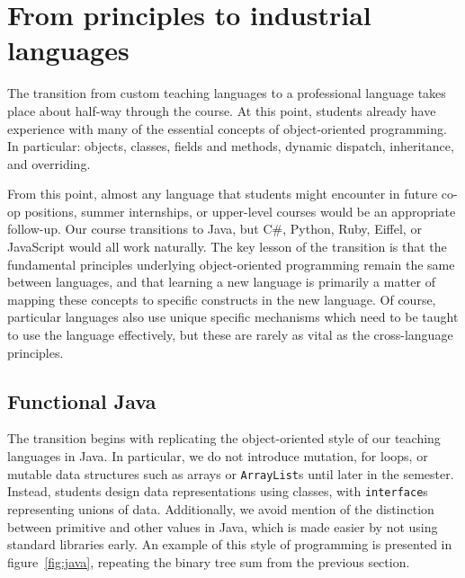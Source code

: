 \documentclass[submission,copyright]{eptcs}
\begin{document}










\section{From principles to industrial languages}
\label{sec:industrial}

The transition from custom teaching languages to a professional
language takes place about half-way through the course.  At this
point, students already have experience with many of the essential
concepts of object-oriented programming. In particular: objects,
classes, fields and methods, dynamic dispatch, inheritance, and
overriding.

From this point, almost any language that students might encounter in
future co-op positions, summer internships, or upper-level courses
would be an appropriate follow-up.  Our course transitions to Java,
but C\#, Python, Ruby, Eiffel, or JavaScript would all work naturally.
The key lesson of the transition is that the fundamental principles
underlying object-oriented programming remain the same between
languages, and that learning a new language is primarily a matter of
mapping these concepts to specific constructs in the new language.  Of
course, particular languages also use unique specific mechanisms which
need to be taught to use the language effectively, but these are
rarely as vital as the cross-language principles.

\subsection{Functional Java}

The transition begins with replicating the object-oriented style of
our teaching languages in Java.  In particular, we do not introduce
mutation, for loops, or mutable data structures such as arrays or
\texttt{ArrayList}s until later in the semester.  Instead, students
design data representations using classes, with \texttt{interface}s
representing unions of data.  Additionally, we avoid mention of the
distinction between primitive and other values in Java, which is made
easier by not using standard libraries early.  An example of this
style of programming is presented in figure~\ref{fig:java}, repeating
the binary tree sum from the previous section.
\end{document}
